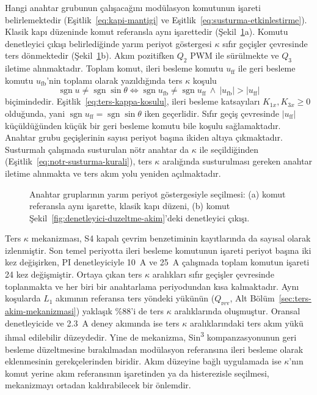 Hangi anahtar grubunun çalışacağını modülasyon komutunun işareti belirlemektedir (Eşitlik~\eqref{eq:kapi-mantigi} ve Eşitlik~\eqref{eq:susturma-etkinlestirme}). Klasik kapı düzeninde komut referansla aynı işarettedir (Şekil~\ref{fig:denetleyici-kapi}a). Komutu denetleyici çıkışı belirlediğinde yarım periyot göstergesi $\kappa$ sıfır geçişler çevresinde ters dönmektedir (Şekil~\ref{fig:denetleyici-kapi}b). Akım pozitifken $Q_2$ PWM ile sürülmekte ve $Q_3$ iletime alınmaktadır. Toplam komut, ileri besleme komutu $u_{\mathrm{ff}}$ ile geri besleme komutu $u_{\mathrm{fb}}$'nin toplamı olarak yazıldığında ters $\kappa$ koşulu
\begin{equation}
  \operatorname{sgn}u\neq\operatorname{sgn}\sin\theta
  \iff
  \operatorname{sgn}u_{\mathrm{fb}}\neq\operatorname{sgn}u_{\mathrm{ff}}
  \ \land\ |u_{\mathrm{fb}}|>|u_{\mathrm{ff}}|
  \label{eq:ters-kappa-kosulu}
\end{equation}
biçimindedir. Eşitlik~\eqref{eq:ters-kappa-kosulu}, ileri besleme katsayıları $K_{1x},K_{3x}\geq0$ olduğunda, yani $\operatorname{sgn}u_{\mathrm{ff}}=\operatorname{sgn}\sin\theta$ iken geçerlidir. Sıfır geçiş çevresinde $|u_{\mathrm{ff}}|$ küçüldüğünden küçük bir geri besleme komutu bile koşulu sağlamaktadır. Anahtar grubu geçişlerinin sayısı periyot başına ikiden altıya çıkmaktadır. Susturmalı çalışmada susturulan nötr anahtar da $\kappa$ ile seçildiğinden (Eşitlik~\eqref{eq:notr-susturma-kurali}), ters $\kappa$ aralığında susturulması gereken anahtar iletime alınmakta ve ters akım yolu yeniden açılmaktadır.

\begin{figure}[H]
  \centering
  
  \caption{Anahtar gruplarının yarım periyot göstergesiyle seçilmesi: (a) komut referansla aynı işarette, klasik kapı düzeni, (b) komut Şekil~\ref{fig:denetleyici-duzeltme-akim}'deki denetleyici çıkışı.}
  \label{fig:denetleyici-kapi}
\end{figure}

Ters $\kappa$ mekanizması, S4 kapalı çevrim benzetiminin kayıtlarında da sayısal olarak izlenmiştir. Son temel periyotta ileri besleme komutunun işareti periyot başına iki kez değişirken, PI denetleyiciyle \SI{10}{\ampere} ve \SI{25}{\ampere} çalışmada toplam komutun işareti 24 kez değişmiştir. Ortaya çıkan ters $\kappa$ aralıkları sıfır geçişler çevresinde toplanmakta ve her biri bir anahtarlama periyodundan kısa kalmaktadır. Aynı koşularda $L_1$ akımının referansa ters yöndeki yükünün ($Q_{\mathrm{rev}}$, Alt Bölüm~\ref{sec:ters-akim-mekanizmasi}) yaklaşık \%88'i de ters $\kappa$ aralıklarında oluşmuştur. Oransal denetleyicide ve \SI{2.3}{\ampere} deney akımında ise ters $\kappa$ aralıklarındaki ters akım yükü ihmal edilebilir düzeydedir. Yine de mekanizma, Sin\textsuperscript{3} kompanzasyonunun geri besleme düzeltmesine bırakılmadan modülasyon referansına ileri besleme olarak eklenmesinin gerekçelerinden biridir. Akım düzeyine bağlı uygulamada ise $\kappa$'nın komut yerine akım referansının işaretinden ya da histerezisle seçilmesi, mekanizmayı ortadan kaldırabilecek bir önlemdir.


